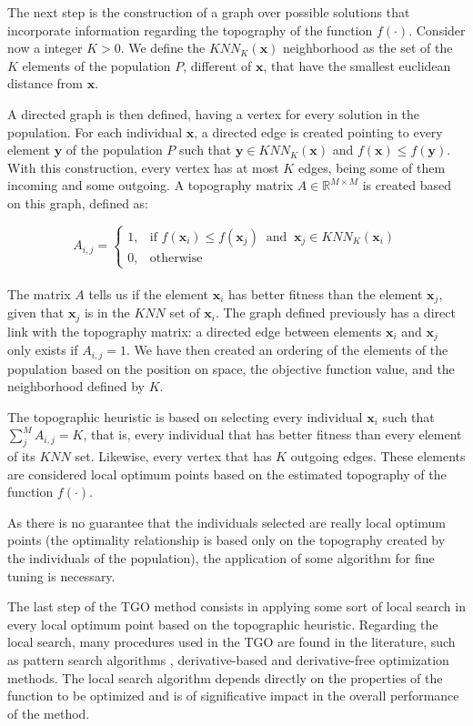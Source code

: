 The next step is the construction of a graph over possible solutions that incorporate information regarding the topography of the function $f(\cdot)$. Consider now a integer $K > 0$. We define the $KNN_K(\bm{x})$ neighborhood as the set of the $K$ elements of the population $P$, different of $\bm{x}$, that have the smallest euclidean distance from $\bm{x}$.

A directed graph is then defined, having a vertex for every solution in the population. For each individual $\bm{x}$, a directed edge is created pointing to every element $\bm{y}$ of the population $P$ such that $\bm{y} \in KNN_K(\bm{x})$ and $f(\bm{x}) \leq f(\bm{y})$. With this construction, every vertex has at most $K$ edges, being some of them incoming and some outgoing. A topography matrix $A \in \mathbb{R}^{M \times M}$ is created based on this graph, defined as:


\[
    A_{i, j} = 
\begin{cases}
    1,& \text{if } f(\bm{x}_i) \leq f(\bm{x}_j) \ \text{ and } \ \bm{x}_j \in KNN_K(\bm{x}_i) \\
    0,& \text{otherwise}
\end{cases}
\]
\\[-1.5em]


The matrix $A$ tells us if the element $\bm{x}_i$ has better fitness than the element $\bm{x}_j$, given that $\bm{x}_j$ is in the $KNN$ set of $\bm{x}_i$. The graph defined previously has a direct link with the topography matrix: a directed edge between elements $\bm{x}_i$ and $\bm{x}_j$ only exists if $A_{i, j} = 1$. We have then created an ordering of the elements of the population based on the position on space, the objective function value, and the neighborhood defined by $K$.

The topographic heuristic is based on selecting every individual $\bm{x}_i$ such that $\sum_j^M A_{i, j} = K$, that is, every individual that has better fitness than every element of its $KNN$ set. Likewise, every vertex that has $K$ outgoing edges. These elements are considered local optimum points based on the estimated topography of the function $f(\cdot)$.

As there is no guarantee that the individuals selected are really local optimum points (the optimality relationship is based only on the topography created by the individuals of the population), the application of 
some algorithm for fine tuning is necessary.

The last step of the TGO method consists in applying some sort of local search in every local optimum point based on the topographic heuristic. Regarding the local search, many procedures used in the TGO are found in the literature, such as pattern search algorithms \citep{ITGO2}, derivative-based \citep{ITGO3} and derivative-free \citep{ITGO4} optimization methods. The local search algorithm depends directly on the properties of the function to be optimized and is of significative impact in the overall performance of the method.

